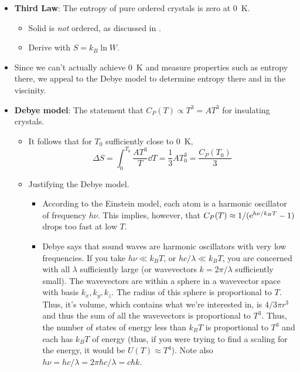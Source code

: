 \documentclass[../notes.tex]{subfiles}
\begin{document}
\begin{itemize}
\begin{itemize}
    \end{itemize}
    \item \textbf{Third Law}: The entropy of pure ordered crystals is zero at \SI{0}{\kelvin}.
    \begin{itemize}
        \item Solid  is \emph{not} ordered, as discussed in \textcite{bib:McQuarrieSimon}.
        \item Derive with $S=k_B\ln W$.
    \end{itemize}
    \item Since we can't actually achieve \SI{0}{\kelvin} and measure properties such as entropy there, we appeal to the Debye model to determine entropy there and in the viscinity.
    \item \textbf{Debye model}: The statement that $C_P(T)\propto T^3=AT^3$ for insulating crystals.
    \begin{itemize}
        \item It follows that for $T_0$ sufficiently close to \SI{0}{\kelvin},
        \begin{equation*}
            \Delta S = \int_0^{T_0}\frac{AT^3}{T}\dd{T}
            = \frac{1}{3}AT_0^3
            = \frac{C_P(T_0)}{3}
        \end{equation*}
        \item Justifying the Debye model.
        \begin{itemize}
            \item According to the Einstein model, each atom is a harmonic oscillator of frequency $h\nu$. This implies, however, that $C_P(T)\approx 1/(\e[h\nu/k_BT]-1)$ drops too fast at low $T$.
            \item Debye says that sound waves are harmonic oscillators with very low frequencies. If you take $h\nu\ll k_BT$, or $hc/\lambda\ll k_BT$, you are concerned with all $\lambda$ sufficiently large (or wavevectors $k=2\pi/\lambda$ sufficiently small). The wavevectors are within a sphere in a wavevector space with basis $k_x,k_y,k_z$. The radius of this sphere is proportional to $T$. Thus, it's volume, which contains what we're interested in, is $4/3\pi r^3$ and thus the sum of all the wavevectors is proportional to $T^3$. Thus, the number of states of energy less than $k_BT$ is proportional to $T^3$ and each has $k_BT$ of energy (thus, if you were trying to find a scaling for the energy, it would be $U(T)\approx T^4$). Note also $h\nu=hc/\lambda=2\pi\hbar c/\lambda=c\hbar k$.
        \end{itemize}

\end{itemize}
\end{itemize}
\end{document}
